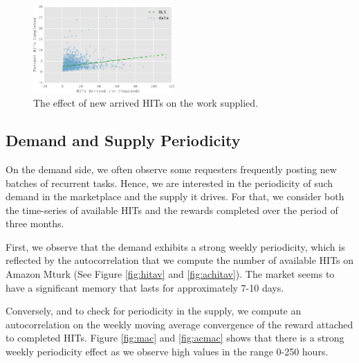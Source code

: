 \begin{figure}[t!]
	\centering
	\includegraphics[width=0.48\textwidth]{figures/percent.pdf}
	\caption{The effect of new arrived HITs on the work  supplied.}
	\label{fig:perc_hits_completed}
\end{figure}

\subsection{Demand and Supply Periodicity}
On the demand side, we often observe some requesters frequently posting new batches of recurrent tasks. Hence, we are interested in the periodicity of such demand in the marketplace and the supply it drives. For that, we consider both the time-series of available HITs and the rewards completed over the period of three months. 

First, we observe that the demand exhibits a strong weekly periodicity, which is reflected by the autocorrelation that we compute the number of available HITs on Amazon Mturk (See Figure \ref{fig:hitav} and \ref{fig:achitav}). The market seems to have a significant memory that lasts for approximately 7-10 days.

Conversely, and to check for periodicity in the supply, we compute an autocorrelation on the weekly moving average convergence of the reward attached to completed HITs. Figure \ref{fig:mac} and \ref{fig:acmac} shows that there is a strong weekly periodicity effect as we observe high values in the range 0-250 hours.

